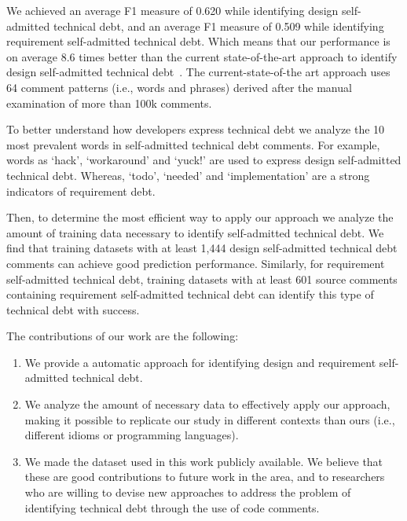 \documentclass{sig-alternate}
\newcommand{\SATD}{self-admitted technical debt\xspace}
\begin{document}
We achieved an average F1 measure of 0.620 while identifying design \SATD, and an average F1 measure of 0.509 while identifying requirement \SATD. Which means that our performance is on average 8.6 times better than the current state-of-the-art approach to identify design \SATD~\cite{Potdar2014ICSME}. The current-state-of-the art approach uses 64 comment patterns (i.e., words and phrases) derived after the manual examination of more than 100k comments.


To better understand how developers express technical debt we analyze the 10 most prevalent words in \SATD comments. For example, words as `hack', `workaround' and `yuck!' are used to express design \SATD. Whereas, `todo', `needed' and `implementation' are a strong indicators of requirement debt.

Then, to determine the most efficient way to apply our approach we analyze the amount of training data necessary to identify \SATD. We find that training datasets with at least 1,444 design \SATD comments can achieve good prediction performance. Similarly, for requirement \SATD, training datasets with at least 601 source comments containing requirement \SATD can identify this type of technical debt with success.  

The contributions of our work are the following:
\begin{enumerate}
	\item We provide a automatic approach for identifying design and requirement \SATD.
	\item We analyze the amount of necessary data to effectively apply our approach, making it possible to replicate our study in different contexts than ours (i.e., different idioms or programming languages).
	\item We made the dataset used in this work publicly available. We believe that these are good contributions to future work in the area, and to researchers who are willing to devise new approaches to address the problem of identifying technical debt through the use of code comments.
\end{enumerate}

\end{document}
